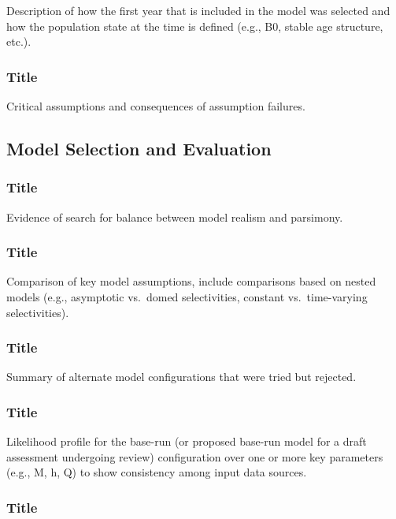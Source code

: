 \documentclass[12pt,]{article}
\begin{document}
Description of how the first year that is included in the model was
selected and how the population state at the time is defined (e.g., B0,
stable age structure, etc.).

\subsubsection{Title}\label{title-14}

Critical assumptions and consequences of assumption failures.

\subsection{Model Selection and
Evaluation}\label{model-selection-and-evaluation}

\subsubsection{Title}\label{title-15}

Evidence of search for balance between model realism and parsimony.

\subsubsection{Title}\label{title-16}

Comparison of key model assumptions, include comparisons based on nested
models (e.g., asymptotic vs.~domed selectivities, constant
vs.~time-varying selectivities).

\subsubsection{Title}\label{title-17}

Summary of alternate model configurations that were tried but rejected.

\subsubsection{Title}\label{title-18}

Likelihood profile for the base-run (or proposed base-run model for a
draft assessment undergoing review) configuration over one or more key
parameters (e.g., M, h, Q) to show consistency among input data sources.

\subsubsection{Title}\label{title-19}
\end{document}
